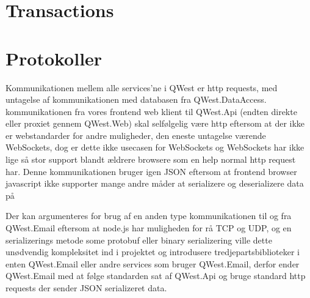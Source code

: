 
\section{Transactions}\label{sec:transactions}

\section{Protokoller}\label{sec:protocols}
Kommunikationen mellem alle services'ne i QWest er http requests, med untagelse af kommunikationen med databasen fra QWest.DataAccess. kommunikationen fra vores frontend web klient til QWest.Api (endten direkte eller proxiet gennem QWest.Web) skal selfølgelig være http eftersom at der ikke er webstandarder for andre muligheder, den eneste untagelse værende WebSockets, dog er dette ikke usecasen for WebSockets og WebSockets har ikke lige så stor support blandt ældrere browsere som en help normal http request har. Denne kommunikationen bruger igen JSON eftersom at frontend browser javascript ikke supporter mange andre måder at serializere og deserializere data på

Der kan argumenteres for brug af en anden type kommunikationen til og fra QWest.Email eftersom at node.js har muligheden for rå TCP og UDP, og en serializerings metode some protobuf \cite{ProtoBuf} eller binary serializering \cite{CsharpBinarySerialization} ville dette unødvendig kompleksitet ind i projektet og introdusere tredjepartsbiblioteker i enten QWest.Email eller andre services som bruger QWest.Email, derfor ender QWest.Email med at følge standarden sat af QWest.Api og bruge standard http requests der sender JSON serializeret data.

